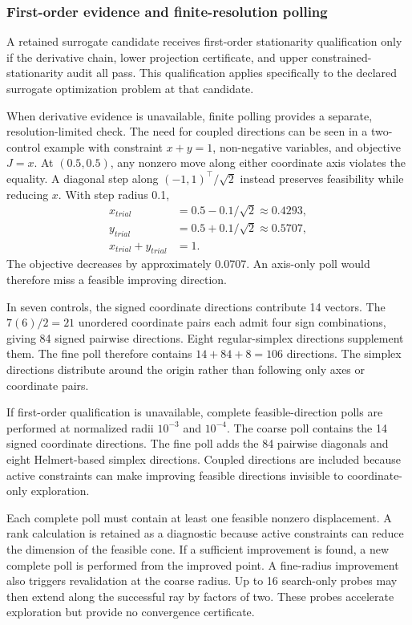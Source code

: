 \subsubsection{First-order evidence and finite-resolution polling}

A retained surrogate candidate receives first-order stationarity qualification only if the derivative chain, lower projection certificate, and upper constrained-stationarity audit all pass. This qualification applies specifically to the declared surrogate optimization problem at that candidate.

When derivative evidence is unavailable, finite polling provides a separate, resolution-limited check. The need for coupled directions can be seen in a two-control example with constraint $x+y=1$, non-negative variables, and objective $J=x$. At $(0.5,0.5)$, any nonzero move along either coordinate axis violates the equality. A diagonal step along $(-1,1)^\top/\sqrt2$ instead preserves feasibility while reducing $x$. With step radius 0.1,
\[
\begin{aligned}
x_{trial}&=0.5-0.1/\sqrt2\approx0.4293,\\
y_{trial}&=0.5+0.1/\sqrt2\approx0.5707,\\
x_{trial}+y_{trial}&=1.
\end{aligned}
\]
The objective decreases by approximately 0.0707. An axis-only poll would therefore miss a feasible improving direction.

In seven controls, the signed coordinate directions contribute 14 vectors. The $7(6)/2=21$ unordered coordinate pairs each admit four sign combinations, giving 84 signed pairwise directions. Eight regular-simplex directions supplement them. The fine poll therefore contains $14+84+8=106$ directions. The simplex directions distribute around the origin rather than following only axes or coordinate pairs.

If first-order qualification is unavailable, complete feasible-direction polls are performed at normalized radii $10^{-3}$ and $10^{-4}$. The coarse poll contains the 14 signed coordinate directions. The fine poll adds the 84 pairwise diagonals and eight Helmert-based simplex directions. Coupled directions are included because active constraints can make improving feasible directions invisible to coordinate-only exploration.

Each complete poll must contain at least one feasible nonzero displacement. A rank calculation is retained as a diagnostic because active constraints can reduce the dimension of the feasible cone. If a sufficient improvement is found, a new complete poll is performed from the improved point. A fine-radius improvement also triggers revalidation at the coarse radius. Up to 16 search-only probes may then extend along the successful ray by factors of two. These probes accelerate exploration but provide no convergence certificate.

